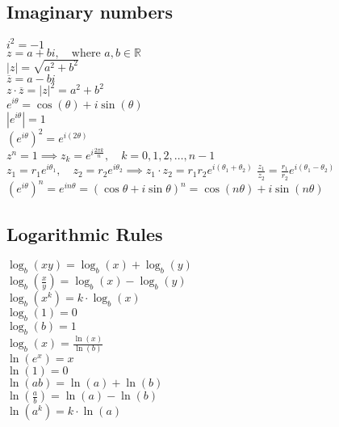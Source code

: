 \documentclass[a4paper,7pt,fleqn]{article}
\begin{document}
\begin{multicols}{3}
\begin{minipage}{\linewidth}
\end{minipage}
\begin{minipage}{\linewidth}

\subsection{Imaginary numbers}

\( i^2 = -1 \) \\ 
\( z = a + bi, \quad \text{where } a, b \in \mathbb{R} \) \\
\( |z| = \sqrt{a^2 + b^2} \) \\
\( \overline{z} = a - bi \) \\
\( z \cdot \overline{z} = |z|^2 = a^2 + b^2 \) \\
\( e^{i\theta} = \cos(\theta) + i\sin(\theta) \) \\
\( |e^{i\theta}| = 1 \) \\
\( \left(e^{i\theta}\right)^2 = e^{i(2\theta)} \) \\
\( z^n = 1 \implies z_k = e^{i\frac{2\pi k}{n}}, \quad k = 0, 1, 2, \dots, n-1 \) \\
\( z_1 = r_1 e^{i\theta_1}, \quad z_2 = r_2 e^{i\theta_2} \implies
z_1 \cdot z_2 = r_1 r_2 e^{i(\theta_1 + \theta_2)} \)
\( \frac{z_1}{z_2} = \frac{r_1}{r_2} e^{i(\theta_1 - \theta_2)} \) \\
\( \left(e^{i\theta}\right)^n = e^{i n \theta} = (\cos\theta + i\sin\theta)^n = \cos(n\theta) + i\sin(n\theta) \) \\

\end{minipage}


\begin{minipage}{\linewidth}
\subsection{Logarithmic Rules}
\(\log_b(xy) = \log_b(x) + \log_b(y)\) \\ 
\(\log_b\left(\frac{x}{y}\right) = \log_b(x) - \log_b(y)\) \\
\(\log_b(x^k) = k \cdot \log_b(x)\) \\
\(\log_b(1) = 0\) \\
\(\log_b(b) = 1\) \\
\(\log_b(x) = \frac{\ln(x)}{\ln(b)}\) \\
\(\ln(e^x) = x\) \\
\(\ln(1) = 0\) \\
\(\ln(ab) = \ln(a) + \ln(b)\) \\
\(\ln\left(\frac{a}{b}\right) = \ln(a) - \ln(b)\) \\
\(\ln(a^k) = k \cdot \ln(a)\)



\end{minipage}
\end{multicols}
\end{document}
